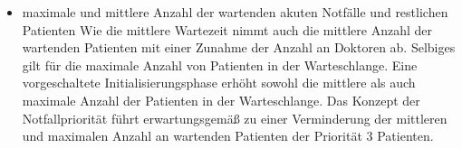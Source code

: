 \documentclass[12pt,fleqn,a4paper]{article}
\begin{document}
\begin{itemize}
	\item maximale und mittlere Anzahl der wartenden akuten 	Notf\"{a}lle und restlichen Patienten 
	Wie die mittlere Wartezeit nimmt auch die mittlere Anzahl der wartenden Patienten mit einer Zunahme der Anzahl an Doktoren ab. Selbiges gilt f\"{u}r die maximale Anzahl von Patienten in der Warteschlange. Eine vorgeschaltete Initialisierungsphase erh\"{o}ht sowohl die mittlere als auch maximale Anzahl der Patienten in der Warteschlange.
Das Konzept der Notfallpriorit\"{a}t f\"{u}hrt erwartungsgem\"{a}ß zu einer Verminderung der mittleren und maximalen Anzahl an wartenden Patienten der Priorit\"{a}t 3 Patienten.
	
\end{itemize}
\end{document}
